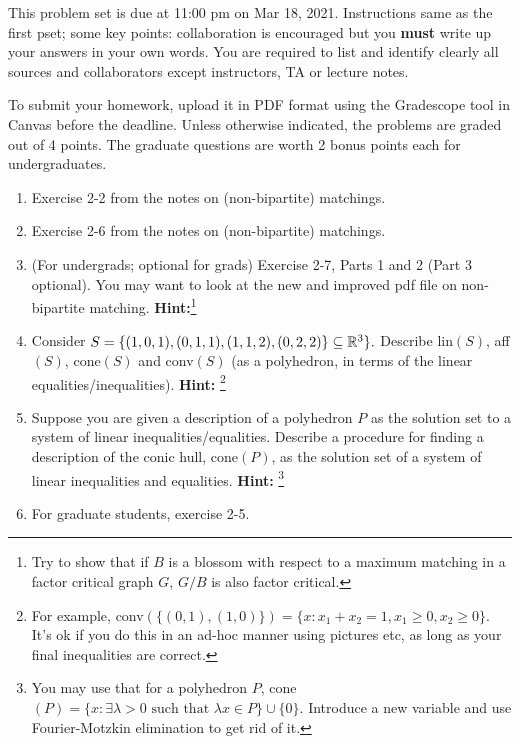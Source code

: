 \documentclass[12pt]{article} 
\begin{document}
\medskip
This problem set is due at 11:00 pm on Mar 18, 2021. Instructions same as the first pset; some key points: collaboration is encouraged but you {\bf must} write up
your answers in your own words. You are required to list and identify clearly all sources and collaborators except instructors, TA or lecture notes.  %

To submit your homework, upload it in PDF format using the Gradescope tool in Canvas before the deadline.
Unless otherwise indicated, the problems are graded out of 4 points. The graduate questions are worth 2 bonus points each for undergraduates.


\begin{enumerate}
\item
Exercise 2-2 from the notes on (non-bipartite) matchings. 
\item
Exercise 2-6 from the notes on (non-bipartite) matchings.

\item (For undergrads; optional for grads) Exercise 2-7, Parts 1 and 2 (Part 3 optional). You may want to look at the new and improved pdf file on non-bipartite matching. \textbf{Hint:}\footnote{Try to show that if $B$ is a blossom with respect to a maximum matching in a factor critical graph $G$, $G/B$ is also factor critical.}

\item
Consider $S=\{(1,0,1),(0,1,1),(1,1,2),(0,2,2)\}\subseteq {\mathbb R}^3\}.$ Describe lin$(S)$, aff$(S)$, cone$(S)$ and conv$(S)$ (as a polyhedron, in terms of the linear equalities/inequalities). \textbf{Hint: }\footnote{ For example, conv$(\{(0,1), (1,0)\}) = \{x: x_1 + x_2 = 1, x_1 \geq 0, x_2 \geq 0\}$. It's ok if you do this in an ad-hoc manner using pictures etc, as long as your final inequalities are correct.}

\item
Suppose you are given a description of a polyhedron $P$ as the solution set to a system of linear inequalities/equalities. Describe a procedure for finding a description of the conic hull, cone$(P)$, as the solution set of a system of linear inequalities and equalities. \textbf{Hint:} \footnote{ You may use that for a polyhedron $P$,  cone$(P) = \{x: \exists \lambda > 0\text{ such that } \lambda x \in P\} \cup \{0\}$. Introduce a new variable and use Fourier-Motzkin elimination to get rid of it.}

\item
For graduate students, exercise 2-5. 

\end{enumerate}
\end{document}
